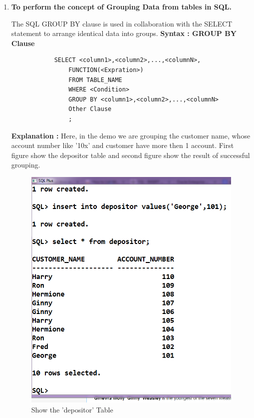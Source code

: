 \documentclass[12pt,a4paper]{report}
\begin{document}
\begin{enumerate}
	\item{ \fontsize{14}{12} \textbf{To perform the concept of Grouping Data from tables in SQL.} }{
		The SQL GROUP BY clause is used in collaboration with the SELECT statement to arrange identical data into groups.
		\textbf{Syntax : GROUP BY Clause}
		\begin{verbatim}
			SELECT <column1>,<column2>,...,<columnN>,
				FUNCTION(<Expration>)
				FROM TABLE_NAME
				WHERE <Condition>
				GROUP BY <column1>,<column2>,...,<columnN>
				Other Clause
				; 
		\end{verbatim}
		
		\textbf{Explanation : }Here, in the demo we are grouping the customer name, whose account number like '10x' and customer have more then 1 account. First figure show the depositor table and second figure show the result of successful grouping. 				
		\begin{figure}[H]
			\centering
			\includegraphics[scale=.45]{./images/3_1_table3_insert1}
			\caption{Show the 'depositor' Table}

\end{figure}}
\end{enumerate}
\end{document}
